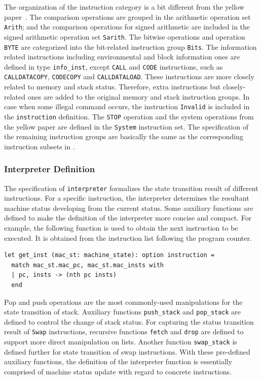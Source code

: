 \documentclass[runningheads]{llncs}
\begin{document}
The organization of the instruction category is a bit different from the yellow paper~\cite{wood2014ethereum}. The comparison operations are grouped in the arithmetic operation set \texttt{Arith}; and the comparison operations for signed arithmetic are included in the signed arithmetic operation set \texttt{Sarith}. The bitwise operations and operation \texttt{BYTE} are categorized into the bit-related instruction group \texttt{Bits}. The information related instructions including environmental and block information ones are defined in type \texttt{info\_inst}, except \texttt{CALL} and \texttt{CODE} instructions, such as \texttt{CALLDATACOPY}, \texttt{CODECOPY} and \texttt{CALLDATALOAD}. These instructions are more closely related to memory and stack status. Therefore, extra instructions but closely-related ones are added to the original memory and stack instruction groups. %
In case when some illegal command occurs, the instruction \texttt{Invalid} is included in the \texttt{instruction} definition. The \texttt{STOP} operation and the system operations from the yellow paper are defined in the \texttt{System} instruction set. The specification of the remaining instruction groups are basically the same as the corresponding instruction subsets in \cite{wood2014ethereum}. 

\subsubsection{Interpreter Definition}\label{sec:interpreter}
The specification of \texttt{interpreter} formalizes the state transition result of different instructions. For a specific instruction, the interpreter determines the resultant machine status developing from the current status. Some auxiliary functions are defined
to make the definition of the interpreter more concise and compact. For example, the following function is used to obtain the next instruction to be executed. It is obtained from the instruction list following the program counter. 
\begin{verbatim}
let get_inst (mac_st: machine_state): option instruction =
  match mac_st.mac_pc, mac_st.mac_insts with 
  | pc, insts -> (nth pc insts) 
  end    
\end{verbatim}

Pop and push operations are the most commonly-used manipulations for the state transition of stack. Auxiliary functions \texttt{push\_stack} and \texttt{pop\_stack} are defined to control the change of stack status. For capturing the status transition result of \texttt{Swap} instructions, recursive functions \texttt{fetch} and \texttt{drop} are defined to support more direct manipulation on lists. Another function \texttt{swap\_stack} is defined further for state transition of swap instructions.
With these pre-defined auxiliary functions, the definition of the interpreter function is essentially comprised of machine status update with regard to concrete instructions. 
\end{document}
